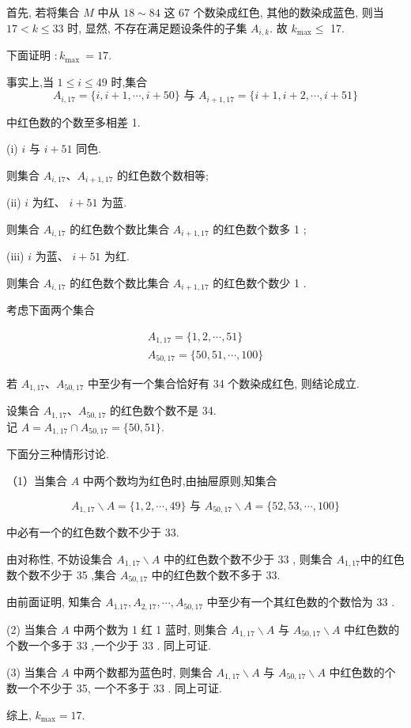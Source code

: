 \begin{solution}
首先, 若将集合 $M$ 中从 $18 \sim 84$ 这 67 个数染成红色, 其他的数染成蓝色, 则当 $17<k \leqslant 33$ 时, 显然, 不存在满足题设条件的子集 $A_{i, k}$. 故 $k_{\max } \leqslant$ 17.

下面证明 $: k_{\text {max }}=17$.

事实上,当 $1 \leqslant i \leqslant 49$ 时,集合
$$
A_{i, 17}=\{i, i+1, \cdots, i+50\} \text { 与 } A_{i+1,17}=\{i+1, i+2, \cdots, i+51\}
$$

中红色数的个数至多相差 1.

(i) $i$ 与 $i+51$ 同色.

则集合 $A_{i, 17} 、 A_{i+1,17}$ 的红色数个数相等;

(ii) $i$ 为红、 $i+51$ 为蓝.

则集合 $A_{i, 17}$ 的红色数个数比集合 $A_{i+1,17}$ 的红色数个数多 1 ;

(iii) $i$ 为蓝、 $i+51$ 为红.

则集合 $A_{i, 17}$ 的红色数个数比集合 $A_{i+1,17}$ 的红色数个数少 1 .

考虑下面两个集合

$$
\begin{gathered}
A_{1,17}=\{1,2, \cdots, 51\} \\
A_{50,17}=\{50,51, \cdots, 100\}
\end{gathered}
$$

若 $A_{1,17} 、 A_{50,17}$ 中至少有一个集合恰好有 34 个数染成红色, 则结论成立.

设集合 $A_{1,17} 、 A_{50,17}$ 的红色数个数不是 34.\\
记 $A=A_{1,17} \cap A_{50,17}=\{50,51\}$.

下面分三种情形讨论.

（1）当集合 $A$ 中两个数均为红色时,由抽屉原则,知集合

$$
A_{1,17} \backslash A=\{1,2, \cdots, 49\} \text { 与 } A_{50,17} \backslash A=\{52,53, \cdots, 100\}
$$

中必有一个的红色数个数不少于 33.

由对称性, 不妨设集合 $A_{1,17} \backslash A$ 中的红色数个数不少于 33 , 则集合 $A_{1,17}$中的红色数个数不少于 35 ,集合 $A_{50,17}$ 中的红色数个数不多于 33.

由前面证明, 知集合 $A_{1.17}, A_{2,17}, \cdots, A_{50,17}$ 中至少有一个其红色数的个数恰为 33 .

(2) 当集合 $A$ 中两个数为 1 红 1 蓝时, 则集合 $A_{1,17} \backslash A$ 与 $A_{50,17} \backslash A$ 中红色数的个数一个多于 33 ,一个少于 33 . 同上可证.

(3) 当集合 $A$ 中两个数都为蓝色时, 则集合 $A_{1,17} \backslash A$ 与 $A_{50,17} \backslash A$ 中红色数的个数一个不少于 35, 一个不多于 33 . 同上可证.

综上, $k_{\max }=17$.
\end{solution}

